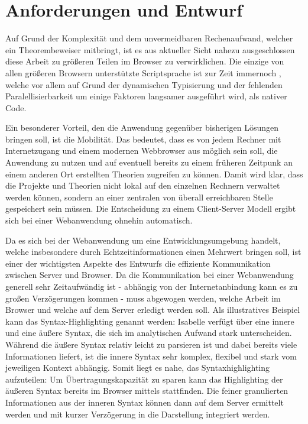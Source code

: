 \chapter{Anforderungen und Entwurf}

Auf Grund der Komplexität und dem unvermeidbaren Rechenaufwand, welcher ein Theorembeweiser
mitbringt, ist es aus aktueller Sicht nahezu ausgeschlossen diese Arbeit zu größeren Teilen im
Browser zu verwirklichen. Die einzige von allen größeren Browsern unterstützte Scriptsprache ist zur
Zeit immernoch , welche vor allem auf Grund der dynamischen Typisierung und der
fehlenden Paralellisierbarkeit um einige Faktoren langsamer ausgeführt wird, als nativer Code.

Ein besonderer Vorteil, den die Anwendung gegenüber bisherigen Lösungen bringen soll, ist die
Mobilität. Das bedeutet, dass es von jedem Rechner mit Internetzugang und einem modernen Webbrowser
aus möglich sein soll, die Anwendung zu nutzen und auf eventuell bereits zu einem früheren Zeitpunk
an einem anderen Ort erstellten Theorien zugreifen zu können. Damit wird klar, dass die Projekte und
Theorien nicht lokal auf den einzelnen Rechnern verwaltet werden können, sondern an einer zentralen
von überall erreichbaren Stelle gespeichert sein müssen. Die Entscheidung zu einem Client-Server
Modell ergibt sich bei einer Webanwendung ohnehin automatisch.

Da es sich bei der Webanwendung um eine Entwicklungsumgebung handelt, welche insbesondere durch
Echtzeitinformationen einen Mehrwert bringen soll, ist einer der wichtigsten Aspekte des Entwurfs
die effiziente Kommunikation zwischen Server und Browser. Da die Kommunikation bei einer
Webanwendung generell sehr Zeitaufwändig ist - abhängig von der Internetanbindung kann es zu großen
Verzögerungen kommen - muss abgewogen werden, welche Arbeit im Browser und welche auf dem Server
erledigt werden soll. Als illustratives Beispiel kann das Syntax-Highlighting genannt werden:
Isabelle verfügt über eine innere und eine äußere Syntax, die sich im analytischen Aufwand stark
unterscheiden. Während die äußere Syntax relativ leicht zu parsieren ist und dabei bereits viele
Informationen liefert, ist die innere Syntax sehr komplex, flexibel und stark vom jeweiligen Kontext
abhängig. Somit liegt es nahe, das Syntaxhighlighting aufzuteilen: Um Übertragungskapazität zu
sparen kann das Highlighting der äußeren Syntax bereits im Browser mittels  stattfinden. Die
feiner granulierten Informationen aus der inneren Syntax können dann auf dem Server ermittelt werden
und mit kurzer Verzögerung in die Darstellung integriert werden.

